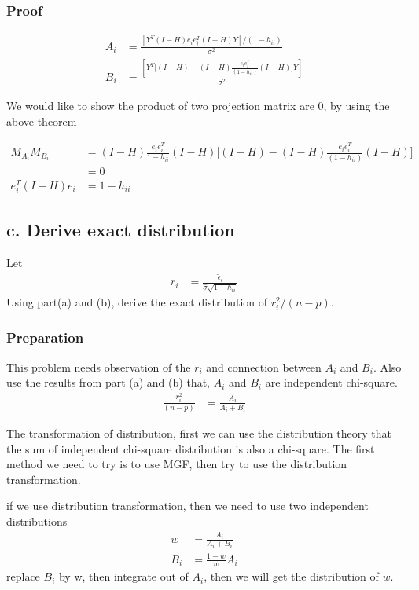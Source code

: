 \documentclass[11pt]{article} %
\begin{document}
\subsubsection{Proof}

\begin{align*}
	A_i & = \frac{ [Y^T (I-H) e_i e_i^T (I-H) Y]/(1-h_{ii})}{\sigma^2} \\
	B_i &=  \frac{ [Y^T \Big[(I-H) - (I-H) \frac{e_i e_i^T }{(1-h_{ii})} (I-H) \Big]Y]}{\sigma^2} 
\end{align*} 

We would like to show the product of two projection matrix are 0, by using the above theorem

\begin{align*}
	M_{A_i} M_{B_i} & = (I-H)  \frac{e_i e_i^T }{1-h_{ii}} (I-H)  \Big[(I-H) - (I-H) \frac{e_i e_i^T }{(1-h_{ii})} (I-H) \Big] \\
	&= 0 \\
	e_i^T (I-H) e_i &= 1-h_{ii}
\end{align*} 


\subsection{c. Derive exact distribution}
Let
\begin{align*}
	r_i & = \frac{\hat{\epsilon}_i}{\hat{\sigma} \sqrt{1- h_{ii}}}
\end{align*} 
Using part(a) and (b), derive the exact distribution of $r_i^2/ (n-p)$.

\subsubsection{Preparation}

This problem needs observation of the $r_i$ and connection between $A_i$ and $B_i$. Also use the results from part (a) and (b) that, $A_i$ and $B_i$ are independent chi-square.
\begin{align*}
	\frac{r_i^2 }{(n-p)} & = \frac{A_i}{A_i + B_i} 
\end{align*} 

The transformation of distribution, first we can use the distribution theory that the sum of independent chi-square distribution is also a chi-square. 
The first method we need to try is to use MGF, then try to use the distribution transformation.

if we use distribution transformation, then we need to use two independent distributions
\begin{align*}
	w & = \frac{A_i}{A_i + B_i} \\
	B_i &= \frac{1-w}{w} A_i
\end{align*} 
replace $B_i$ by w, then integrate out of $A_i$, then we will get the distribution of $w$.
\end{document}
